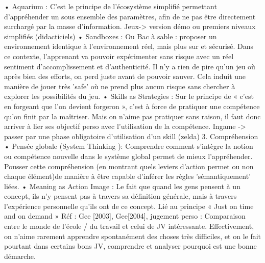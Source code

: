 • Aquarium : C'est le principe de l'écosystème simplifié permettant d'appréhender un sous
ensemble des paramètres, afin de ne pas être directement surchargé par la masse
d'information. Jeux-> version démo ou premiers niveaux simplifiés (didacticiels)
• Sandboxes : Ou Bac à sable : proposer un environnement identique à l'environnement
réel, mais plus sur et sécurisé. Dans ce contexte, l'apprenant va pouvoir expérimenter
sans risque avec un réel sentiment d'accomplissement et d'authenticité.
Il n'y a rien de pire qu'un jeu où après bien des efforts, on perd juste avant de pouvoir
sauver. Cela induit une manière de jouer très 'safe' où ne prend plus aucun risque sans
chercher à explorer les possibilités du jeu.
• Skills as Strategies : Sur le principe de « c'est en forgeant que l'on devient forgeron »,
c'est à force de pratiquer une compétence qu'on finit par la maîtriser. Mais on n'aime pas
pratiquer sans raison, il faut donc arriver à lier ses objectif perso avec l'utilisation de la
compétence. Ingame -> passer par une phase obligatoire d'utilisation d'un skill (zelda)
3. Compréhension
• Pensée globale (System Thinking ): Comprendre comment s'intègre la notion ou
compétence nouvelle dans le système global permet de mieux l'appréhender. Pousser
cette compréhension (en montrant quels leviers d'action permet ou non chaque
élément)de manière à être capable d'inférer les règles 'sémantiquement' liées.
• Meaning as Action Image : Le fait que quand les gens pensent à un concept, ils n'y
pensent pas à travers sa définition générale, mais à travers l'expérience personnelle qu'ils
ont de ce concept. Lié au principe « Just on time and on demand »
Réf :
Gee [2003], Gee[2004],
jugement perso :
Comparaison entre le monde de l'école / du travail et celui de JV intéressante. Effectivement, on
n'aime rarement apprendre spontanément des choses très difficiles, et on le fait pourtant dans
certains bons JV, comprendre et analyser pourquoi est une bonne démarche.		

